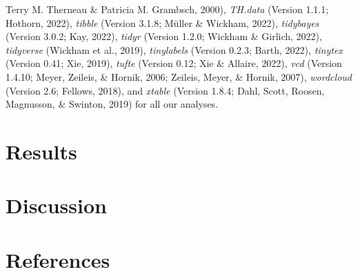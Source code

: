\documentclass[
  english,
  man]{apa6}
\begin{document}
Terry M. Therneau \& Patricia M. Grambsch, 2000), \emph{TH.data} (Version 1.1.1; Hothorn, 2022), \emph{tibble} (Version 3.1.8; Müller \& Wickham, 2022), \emph{tidybayes} (Version 3.0.2; Kay, 2022), \emph{tidyr} (Version 1.2.0; Wickham \& Girlich, 2022), \emph{tidyverse} (Wickham et al., 2019), \emph{tinylabels} (Version 0.2.3; Barth, 2022), \emph{tinytex} (Version 0.41; Xie, 2019), \emph{tufte} (Version 0.12; Xie \& Allaire, 2022), \emph{vcd} (Version 1.4.10; Meyer, Zeileis, \& Hornik, 2006; Zeileis, Meyer, \& Hornik, 2007), \emph{wordcloud} (Version 2.6; Fellows, 2018), and \emph{xtable} (Version 1.8.4; Dahl, Scott, Roosen, Magnusson, \& Swinton, 2019) for all our analyses.

\hypertarget{results}{%
\section{Results}\label{results}}

\hypertarget{discussion}{%
\section{Discussion}\label{discussion}}

\newpage

\hypertarget{references}{%
\section{References}\label{references}}
\end{document}
